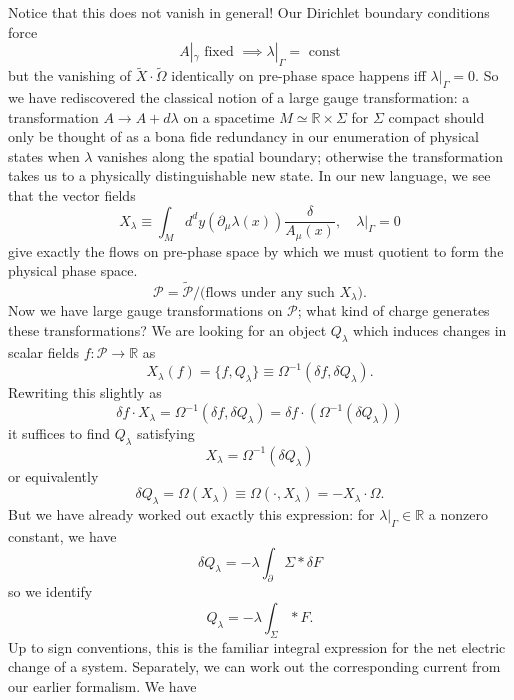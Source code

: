\documentclass[11pt,letterpaper]{article}
\newcommand{\LP}{\left(}
\newcommand{\RP}{\right)}
\newcommand{\mc}[1]{\mathcal{#1}}
\newcommand{\R}{\mathbb{R}}
\newcommand{\D}{\partial}
\begin{document}
Notice that this does not vanish in general! Our Dirichlet boundary conditions force
\begin{equation}
A|_\gamma \mbox{ fixed } \implies \lambda|_\Gamma = \mbox{ const}
\end{equation}
but the vanishing of $\tilde{X} \cdot \tilde{\Omega}$ identically on pre-phase space happens iff $\lambda|_\Gamma = 0$. So we have rediscovered the classical notion of a large gauge transformation: a transformation $A \to A + d \lambda$ on a spacetime $M \simeq \R \times \Sigma$ for $\Sigma$ compact should only be thought of as a bona fide redundancy in our enumeration of physical states when $\lambda$ vanishes along the spatial boundary; otherwise the transformation takes us to a physically distinguishable new state. In our new language, we see that the vector fields \begin{equation}
X_\lambda \equiv \int_M d^d y (\D_\mu \lambda(x)) \frac{\delta}{A_\mu(x)}, \quad \lambda|_\Gamma = 0
\end{equation}
give exactly the flows on pre-phase space by which we must quotient to form the physical phase space. \begin{equation}
\mc{P} = \tilde{\mc{P}} / \mbox{(flows under any such $X_\lambda$)}.
\end{equation}
Now we have large gauge transformations on $\mc{P}$; what kind of charge generates these transformations? We are looking for an object $Q_\lambda$ which induces changes in scalar fields $f: \mc{P} \to \R$ as \begin{equation}
X_\lambda(f) = \{f, Q_\lambda\} \equiv \Omega^{-1} \LP \delta f, \delta Q_\lambda \RP.
\end{equation}
Rewriting this slightly as \begin{equation}
\delta f \cdot X_\lambda = \Omega^{-1}(\delta f, \delta Q_\lambda) = \delta f \cdot \LP \Omega^{-1}(\delta Q_\lambda) \RP
\end{equation}
it suffices to find $Q_\lambda$ satisfying \begin{equation}
X_\lambda = \Omega^{-1} (\delta Q_\lambda)
\end{equation}
or equivalently \begin{equation}
\delta Q_\lambda = \Omega(X_\lambda) \equiv \Omega( \cdot, X_\lambda) = - X_\lambda \cdot \Omega.
\end{equation}
But we have already worked out exactly this expression: for $\lambda|_\Gamma \in \R$ a nonzero constant, we have \begin{equation}
\delta Q_\lambda = - \lambda \int_\D \Sigma * \delta F
\end{equation}
so we identify \begin{equation}
Q_\lambda = - \lambda \int_\Sigma * F.
\end{equation}
Up to sign conventions, this is the familiar integral expression for the net electric change of a system. Separately, we can work out the corresponding current from our earlier formalism. We have 
\end{document}
